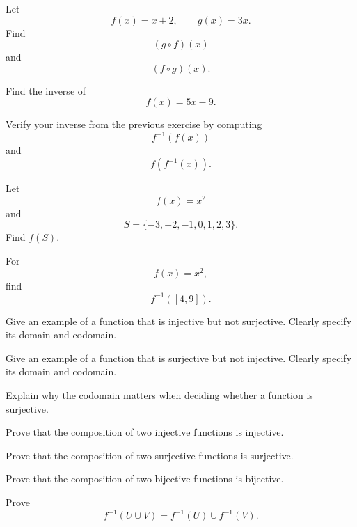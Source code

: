 \begin{exercise}[1]
Let
\[ f(x)=x+2,\qquad g(x)=3x. \]
Find
\[ (g\circ f)(x) \]
and
\[ (f\circ g)(x). \]
\end{exercise}

\begin{exercise}[2]
Find the inverse of
\[ f(x)=5x-9. \]
\end{exercise}

\begin{exercise}[2]
Verify your inverse from the previous exercise by computing
\[ f^{-1}(f(x)) \]
and
\[ f(f^{-1}(x)). \]
\end{exercise}

\begin{exercise}[2]
Let
\[ f(x)=x^2 \]
and
\[ S=\{-3,-2,-1,0,1,2,3\}. \]
Find \(f(S)\).
\end{exercise}

\begin{exercise}[2]
For
\[ f(x)=x^2, \]
find
\[ f^{-1}([4,9]). \]
\end{exercise}

\begin{exercise}[2]
Give an example of a function that is injective but not surjective.
Clearly specify its domain and codomain.
\end{exercise}

\begin{exercise}[2]
Give an example of a function that is surjective but not injective.
Clearly specify its domain and codomain.
\end{exercise}

\begin{exercise}[2]
Explain why the codomain matters when deciding whether a function is
surjective.
\end{exercise}

\begin{exercise}[3]
Prove that the composition of two injective functions is injective.
\end{exercise}

\begin{exercise}[3]
Prove that the composition of two surjective functions is surjective.
\end{exercise}

\begin{exercise}[3]
Prove that the composition of two bijective functions is bijective.
\end{exercise}

\begin{exercise}[3]
Prove
\[ f^{-1}(U\cup V)=f^{-1}(U)\cup f^{-1}(V). \]
\end{exercise}

